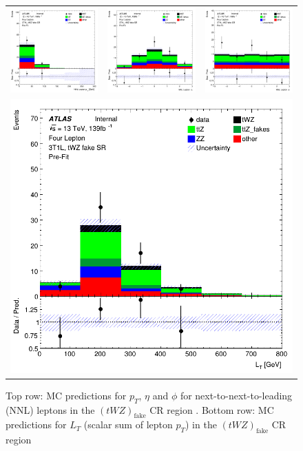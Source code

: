 \begin{figure}[htbp]
    \centering
  \begin{tabular}{ccc}



    \includegraphics[width=.2\textwidth]{figures/PreFitPlots/lep4_tWZ_3T1L_NNL_lepton_pt} &
    \includegraphics[width=.2\textwidth]{figures/PreFitPlots/lep4_tWZ_3T1L_NNL_lepton_eta} &
    \includegraphics[width=.2\textwidth]{figures/PreFitPlots/lep4_tWZ_3T1L_NNL_lepton_phi} \\
    \multicolumn{3}{c}{\includegraphics[width=.2\textwidth]{figures/PreFitPlots/lep4_tWZ_3T1L_LT} }\\

  \end{tabular}
  \caption{Top row: MC predictions for $p_{T}$, $\eta$ and $\phi$ for next-to-next-to-leading (NNL) leptons in the $(tWZ)_{\text{fake}}$ CR region . Bottom row: MC predictions for $L_{T}$ (scalar sum of lepton $p_{T}$)  in the $(tWZ)_{\text{fake}}$ CR region }
  \label{fig:4lep-3T1L-CR-leptonPlots}
\end{figure}
\clearpage


